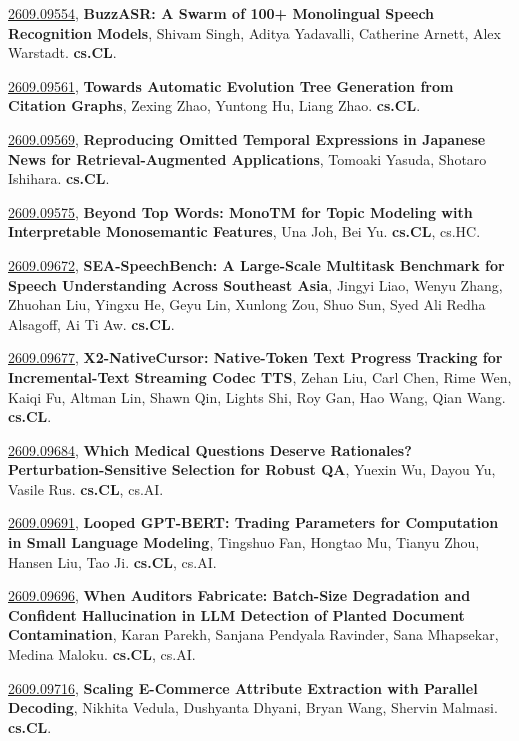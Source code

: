 \documentclass[9pt, a4paper]{article}
\theoremstyle{plain}
\theoremstyle{definition}
\theoremstyle{remark}
\newcommand{\arxivwithtarget}[3]{\hypertarget{#1}{}\href{https://arxiv.org/abs/#1}{#1}, \textbf{\textcolor{arxivblue}{#2}}, #3. }
\begin{document}
\arxivwithtarget{2609.09554}{BuzzASR: A Swarm of 100+ Monolingual Speech Recognition Models}{Shivam Singh, Aditya Yadavalli, Catherine Arnett, Alex Warstadt}\textbf{cs.CL}.



\arxivwithtarget{2609.09561}{Towards Automatic Evolution Tree Generation from Citation Graphs}{Zexing Zhao, Yuntong Hu, Liang Zhao}\textbf{cs.CL}.



\arxivwithtarget{2609.09569}{Reproducing Omitted Temporal Expressions in Japanese News for Retrieval-Augmented Applications}{Tomoaki Yasuda, Shotaro Ishihara}\textbf{cs.CL}.



\arxivwithtarget{2609.09575}{Beyond Top Words: MonoTM for Topic Modeling with Interpretable Monosemantic Features}{Una Joh, Bei Yu}\textbf{cs.CL}, cs.HC.



\arxivwithtarget{2609.09672}{SEA-SpeechBench: A Large-Scale Multitask Benchmark for Speech Understanding Across Southeast Asia}{Jingyi Liao, Wenyu Zhang, Zhuohan Liu, Yingxu He, Geyu Lin, Xunlong Zou, Shuo Sun, Syed Ali Redha Alsagoff, Ai Ti Aw}\textbf{cs.CL}.



\arxivwithtarget{2609.09677}{X2-NativeCursor: Native-Token Text Progress Tracking for Incremental-Text Streaming Codec TTS}{Zehan Liu, Carl Chen, Rime Wen, Kaiqi Fu, Altman Lin, Shawn Qin, Lights Shi, Roy Gan, Hao Wang, Qian Wang}\textbf{cs.CL}.



\arxivwithtarget{2609.09684}{Which Medical Questions Deserve Rationales? Perturbation-Sensitive Selection for Robust QA}{Yuexin Wu, Dayou Yu, Vasile Rus}\textbf{cs.CL}, cs.AI.



\arxivwithtarget{2609.09691}{Looped GPT-BERT: Trading Parameters for Computation in Small Language Modeling}{Tingshuo Fan, Hongtao Mu, Tianyu Zhou, Hansen Liu, Tao Ji}\textbf{cs.CL}, cs.AI.



\arxivwithtarget{2609.09696}{When Auditors Fabricate: Batch-Size Degradation and Confident Hallucination in LLM Detection of Planted Document Contamination}{Karan Parekh, Sanjana Pendyala Ravinder, Sana Mhapsekar, Medina Maloku}\textbf{cs.CL}, cs.AI.



\arxivwithtarget{2609.09716}{Scaling E-Commerce Attribute Extraction with Parallel Decoding}{Nikhita Vedula, Dushyanta Dhyani, Bryan Wang, Shervin Malmasi}\textbf{cs.CL}.
\end{document}
